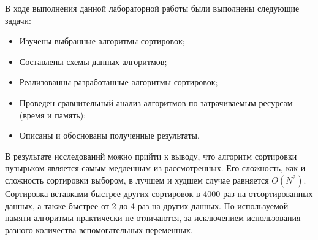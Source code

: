 
В ходе выполнения данной лабораторной работы были выполнены следующие задачи:
\begin{itemize}
	\item Изучены выбранные алгоритмы сортировок;
	\item Составлены схемы данных алгоритмов;
	\item Реализованны разработанные алгоритмы сортировок;
	\item Проведен сравнительный анализ алгоритмов по затрачиваемым ресурсам (время и память);
	\item Описаны и обоснованы полученные результаты.
\end{itemize}

В результате исследований можно прийти к выводу, что алгоритм сортировки пузырьком является самым медленным из рассмотренных. Его сложность, как и сложность сортировки выбором, в лучшем и худшем случае равняется $O(N^2)$. Сортировка вставками быстрее других сортировок в 4000 раз на отсортированных данных, а также быстрее от 2 до 4 раз на других данных. По используемой памяти алгоритмы практически не отличаются, за исключением использования разного количества вспомогательных переменных.